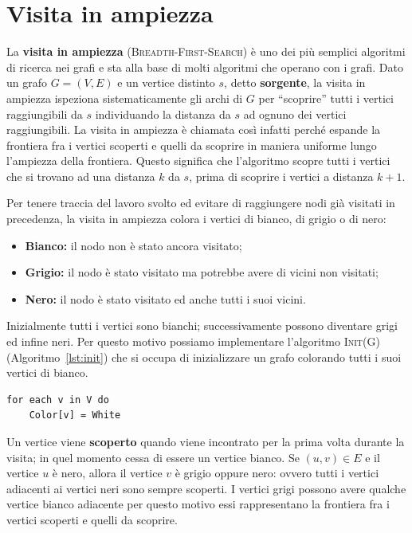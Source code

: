 \section{Visita in ampiezza}
La \textbf{visita in ampiezza} (\textsc{Breadth-First-Search}) è uno dei più semplici algoritmi di ricerca nei grafi e sta alla base di molti algoritmi che operano con i grafi. Dato un grafo $G=(V,E)$ e un vertice distinto $s$, detto \textbf{sorgente}, la visita in ampiezza ispeziona sistematicamente gli archi di $G$ per ``scoprire'' tutti i vertici raggiungibili da $s$ individuando la distanza da $s$ ad ognuno dei vertici raggiungibili. La visita in ampiezza è chiamata così infatti perché espande la frontiera fra i vertici scoperti e quelli da scoprire in maniera uniforme lungo l'ampiezza della frontiera. Questo significa che l'algoritmo scopre tutti i vertici che si trovano ad una distanza $k$ da $s$, prima di scoprire i vertici a distanza $k+1$.

Per tenere traccia del lavoro svolto ed evitare di raggiungere nodi già visitati in precedenza, la visita in ampiezza colora i vertici di bianco, di grigio o di nero:
\begin{itemize}
	\item \textbf{Bianco:} il nodo non è stato ancora visitato;
	\item \textbf{Grigio:} il nodo è stato visitato ma potrebbe avere di vicini non visitati;
	\item \textbf{Nero:} il nodo è stato visitato ed anche tutti i suoi vicini.
\end{itemize}
Inizialmente tutti i vertici sono bianchi; successivamente possono diventare grigi ed infine neri. Per questo motivo possiamo implementare l'algoritmo \textsc{Init(G)} (Algoritmo~\ref{lst:init}) che si occupa di inizializzare un grafo colorando tutti i suoi vertici di bianco.
\begin{lstlisting}[language=asd,caption={Init(G)},label=lst:init]
for each v in V do
	Color[v] = White
\end{lstlisting}

Un vertice viene \textbf{scoperto} quando viene incontrato per la prima volta durante la visita; in quel momento cessa di essere un vertice bianco. Se $(u,v) \in E$ e il vertice $u$ è nero, allora il vertice $v$ è grigio oppure nero: ovvero tutti i vertici adiacenti ai vertici neri sono sempre scoperti. I vertici grigi possono avere qualche vertice bianco adiacente per questo motivo essi rappresentano la frontiera fra i vertici scoperti e quelli da scoprire.

